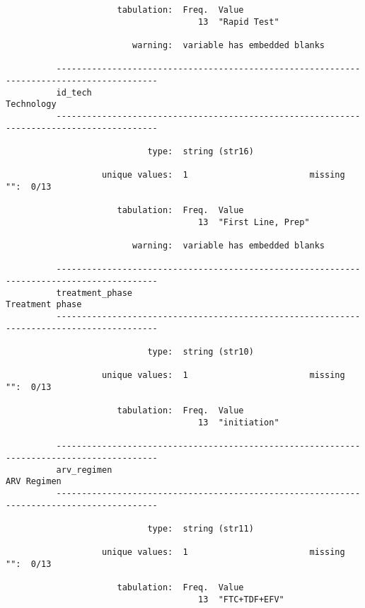 \documentclass{article}
\begin{document}
\begin{verbatim}
                      tabulation:  Freq.  Value
                                      13  "Rapid Test"
          
                         warning:  variable has embedded blanks
          
          ------------------------------------------------------------------------------------------
          id_tech                                                                         Technology
          ------------------------------------------------------------------------------------------
          
                            type:  string (str16)
          
                   unique values:  1                        missing "":  0/13
          
                      tabulation:  Freq.  Value
                                      13  "First Line, Prep"
          
                         warning:  variable has embedded blanks
          
          ------------------------------------------------------------------------------------------
          treatment_phase                                                            Treatment phase
          ------------------------------------------------------------------------------------------
          
                            type:  string (str10)
          
                   unique values:  1                        missing "":  0/13
          
                      tabulation:  Freq.  Value
                                      13  "initiation"
          
          ------------------------------------------------------------------------------------------
          arv_regimen                                                                    ARV Regimen
          ------------------------------------------------------------------------------------------
          
                            type:  string (str11)
          
                   unique values:  1                        missing "":  0/13
          
                      tabulation:  Freq.  Value
                                      13  "FTC+TDF+EFV"
          

\end{verbatim}
\end{document}
